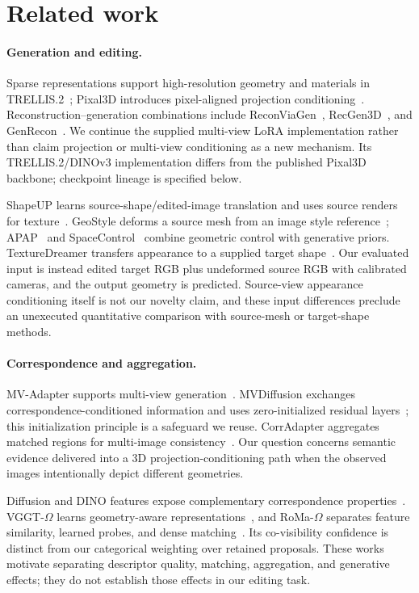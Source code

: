 \section{Related work}
\paragraph{Generation and editing.}
Sparse representations support high-resolution geometry and materials in
TRELLIS.2~\cite{xiang2025trellis2}; Pixal3D introduces pixel-aligned projection
conditioning~\cite{li2026pixal3d}. Reconstruction--generation combinations
include ReconViaGen~\cite{chang2025reconviagen}, RecGen3D~\cite{huang2026recgen3d},
and GenRecon~\cite{schmid2026genrecon}. We continue the supplied multi-view
LoRA implementation rather than claim projection or multi-view conditioning
as a new mechanism. Its TRELLIS.2/DINOv3 implementation differs from the
published Pixal3D backbone; checkpoint lineage is specified below.

ShapeUP learns source-shape/edited-image translation and uses source renders
for texture~\cite{gat2026shapeup}. GeoStyle deforms a source mesh from an image
style reference~\cite{choi2026geostyle}; APAP~\cite{yoo2024apap} and
SpaceControl~\cite{fedele2025spacecontrol} combine geometric control with
generative priors. TextureDreamer transfers appearance to a supplied target
shape~\cite{yeh2024texturedreamer}. Our evaluated input is instead edited
target RGB plus undeformed source RGB with calibrated cameras, and the output
geometry is predicted. Source-view appearance conditioning itself is not our
novelty claim, and these input differences preclude an unexecuted quantitative
comparison with source-mesh or target-shape methods.

\paragraph{Correspondence and aggregation.}
MV-Adapter supports multi-view generation~\cite{huang2025mvadapter}.
MVDiffusion exchanges correspondence-conditioned information and uses
zero-initialized residual layers~\cite{tang2023mvdiffusion}; this initialization
principle is a safeguard we reuse. CorrAdapter aggregates matched regions
for multi-image consistency~\cite{zhang2026corradapter}. Our question concerns
semantic evidence delivered into a 3D projection-conditioning path when the
observed images intentionally depict different geometries.

Diffusion and DINO features expose complementary correspondence
properties~\cite{tang2023dift,zhang2023twofeatures}. VGGT-$\Omega$
learns geometry-aware representations~\cite{wang2026vggtomega}, and
RoMa-$\Omega$ separates feature similarity, learned probes, and dense
matching~\cite{nordstrom2026romaomega}. Its co-visibility confidence is distinct
from our categorical weighting over retained proposals. These works motivate
separating descriptor quality, matching, aggregation, and generative effects;
they do not establish those effects in our editing task.
